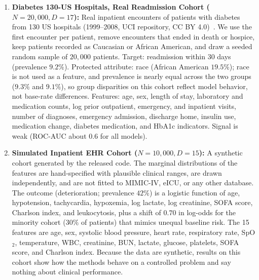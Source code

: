 \documentclass[pdflatex,sn-vancouver-num,referee,lineno]{sn-jnl}
\theoremstyle{thmstyleone}
\theoremstyle{thmstylethree}
\begin{document}
\begin{enumerate}
    \item \textbf{Diabetes 130-US Hospitals, Real Readmission Cohort ($N=20{,}000, D=17$):} Real inpatient encounters of patients with diabetes from 130 US hospitals (1999--2008, UCI repository, CC BY 4.0)~\cite{strack2014impact}. We use the first encounter per patient, remove encounters that ended in death or hospice, keep patients recorded as Caucasian or African American, and draw a seeded random sample of $20{,}000$ patients. Target: readmission within 30 days (prevalence $9.2\%$). Protected attribute: race (African American $19.5\%$); race is not used as a feature, and prevalence is nearly equal across the two groups ($9.3\%$ and $9.1\%$), so group disparities on this cohort reflect model behavior, not base-rate differences. Features: age, sex, length of stay, laboratory and medication counts, log prior outpatient, emergency, and inpatient visits, number of diagnoses, emergency admission, discharge home, insulin use, medication change, diabetes medication, and HbA1c indicators. Signal is weak (ROC-AUC about $0.6$ for all models).
    \item \textbf{Simulated Inpatient EHR Cohort ($N=10{,}000, D=15$):} A synthetic cohort generated by the released code. The marginal distributions of the features are hand-specified with plausible clinical ranges, are drawn independently, and are not fitted to MIMIC-IV, eICU, or any other database. The outcome (deterioration; prevalence $42\%$) is a logistic function of age, hypotension, tachycardia, hypoxemia, log lactate, log creatinine, SOFA score, Charlson index, and leukocytosis, plus a shift of $0.70$ in log-odds for the minority cohort ($30\%$ of patients) that mimics unequal baseline risk. The 15 features are age, sex, systolic blood pressure, heart rate, respiratory rate, SpO$_2$, temperature, WBC, creatinine, BUN, lactate, glucose, platelets, SOFA score, and Charlson index. Because the data are synthetic, results on this cohort show how the methods behave on a controlled problem and say nothing about clinical performance.
\end{enumerate}
\end{document}
